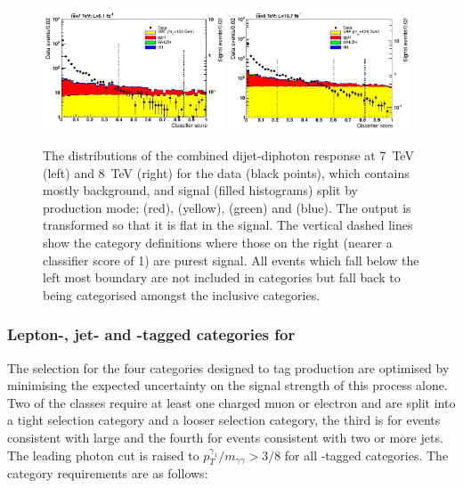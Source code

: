 \begin{figure}
  \includegraphics[width=0.48\textwidth]{selec_and_cats/plots/mixedcombbdt_transformed_7TeV_fix_fix.pdf}
  \includegraphics[width=0.48\textwidth]{selec_and_cats/plots/mixedcombbdt_transformed_8TeV_fix_fix.pdf}
  \caption[The distribution of the combined dijet-diphoton \acs{BDT} response]{The distributions of the combined dijet-diphoton \BDT response at 7~TeV (left) and 8~TeV (right) for the data (black points), which contains mostly background, and signal (filled histograms) split by production mode; \ggH (red), \VBF (yellow), \VH (green) and \ttH (blue). The output is transformed so that it is flat in the \VBF signal. The vertical dashed lines show the \VBF category definitions where those on the right (nearer a classifier score of 1) are purest \VBF signal. All events which fall below the left most boundary are not included in \VBF categories but fall back to being categorised amongst the inclusive categories.}
  \label{fig:vbf_dijet_comb}
\end{figure}

\subsubsection{Lepton-, jet- and \MET-tagged categories for \VH}
\label{sec:vh_tag}

The selection for the four categories designed to tag \VH production are optimised by minimising the expected uncertainty on the signal strength of this process alone. Two of the classes require at least one charged muon or electron and are split into a tight selection category and a looser selection category, the third is for events consistent with large \MET and the fourth for events consistent with two or more jets. The leading photon cut is raised to $p_{T}^{\gamma_{1}}/m_{\gamma\gamma}>3/8$ for all \VH-tagged categories. The category requirements are as follows:

